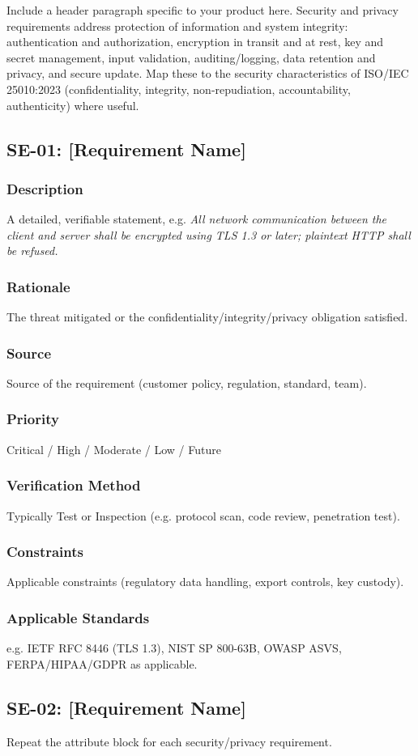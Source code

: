 Include a header paragraph specific to your product here. Security and privacy requirements address protection of information and system integrity: authentication and authorization, encryption in transit and at rest, key and secret management, input validation, auditing/logging, data retention and privacy, and secure update. Map these to the security characteristics of ISO/IEC 25010:2023 \cite{ISO25010} (confidentiality, integrity, non-repudiation, accountability, authenticity) where useful.

\subsection{SE-01: [Requirement Name]}
\subsubsection{Description}
A detailed, verifiable statement, e.g. \textit{All network communication between the client and server shall be encrypted using TLS 1.3 or later; plaintext HTTP shall be refused.}
\subsubsection{Rationale}
The threat mitigated or the confidentiality/integrity/privacy obligation satisfied.
\subsubsection{Source}
Source of the requirement (customer policy, regulation, standard, team).
\subsubsection{Priority}
Critical / High / Moderate / Low / Future
\subsubsection{Verification Method}
Typically Test or Inspection (e.g. protocol scan, code review, penetration test).
\subsubsection{Constraints}
Applicable constraints (regulatory data handling, export controls, key custody).
\subsubsection{Applicable Standards}
e.g. IETF RFC 8446 (TLS 1.3), NIST SP 800-63B, OWASP ASVS, FERPA/HIPAA/GDPR as applicable.

\subsection{SE-02: [Requirement Name]}
Repeat the attribute block for each security/privacy requirement.
